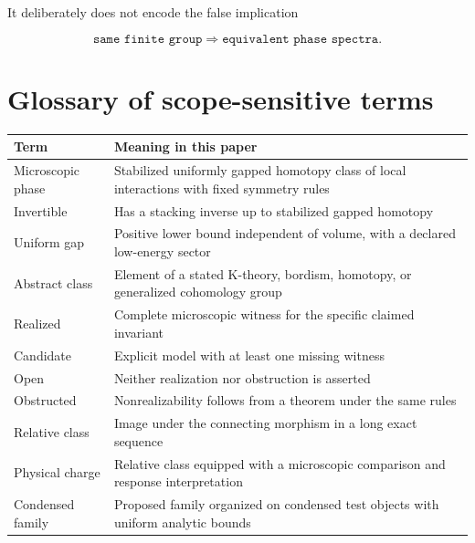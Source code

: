 \documentclass[12pt]{article}
\theoremstyle{definition}
\theoremstyle{remark}
\begin{document}
It deliberately does not encode the false implication

\begin{equation}
  \texttt{same finite group}
  \Longrightarrow
  \texttt{equivalent phase spectra}.
\end{equation}

\section{Glossary of scope-sensitive terms}

\begin{longtable}{>{\raggedright\arraybackslash}p{}
                  >{\raggedright\arraybackslash}p{}}
\toprule
Term & Meaning in this paper \\
\midrule
Microscopic phase & Stabilized uniformly gapped homotopy class of local interactions with fixed symmetry rules \\
Invertible & Has a stacking inverse up to stabilized gapped homotopy \\
Uniform gap & Positive lower bound independent of volume, with a declared low-energy sector \\
Abstract class & Element of a stated K-theory, bordism, homotopy, or generalized cohomology group \\
Realized & Complete microscopic witness for the specific claimed invariant \\
Candidate & Explicit model with at least one missing witness \\
Open & Neither realization nor obstruction is asserted \\
Obstructed & Nonrealizability follows from a theorem under the same rules \\
Relative class & Image under the connecting morphism in a long exact sequence \\
Physical charge & Relative class equipped with a microscopic comparison and response interpretation \\
Condensed family & Proposed family organized on condensed test objects with uniform analytic bounds \\
\bottomrule
\end{longtable}
\end{document}
